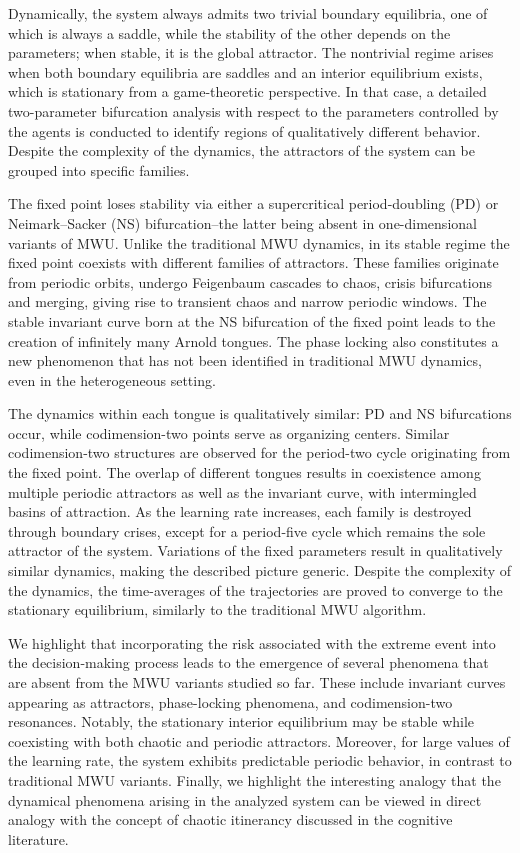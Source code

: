 \documentclass{article}
\theoremstyle{plain}
\theoremstyle{definition}
\begin{document}
Dynamically, the system always admits two trivial boundary equilibria, one of which is always a saddle, while the stability of the other depends on the parameters; when stable, it is the global attractor. The nontrivial regime arises when both boundary equilibria are saddles and an interior equilibrium exists, which is stationary from a game-theoretic perspective. In that case, a detailed two-parameter bifurcation analysis with respect to the parameters controlled by the agents is conducted to identify regions of qualitatively different behavior. Despite the complexity of the dynamics, the attractors of the system can be grouped into specific families. 

The fixed point loses stability via either a supercritical period-doubling (PD) or Neimark--Sacker (NS) bifurcation--the latter being absent in one-dimensional variants of MWU. Unlike the traditional MWU dynamics, in its stable regime the fixed point coexists with different families of attractors. These families originate from periodic orbits, undergo Feigenbaum cascades to chaos, crisis bifurcations and merging, giving rise to transient chaos and narrow periodic windows. The stable invariant curve born at the NS bifurcation of the fixed point leads to the creation of infinitely many Arnold tongues. The phase locking also constitutes a new phenomenon that has not been identified in traditional MWU dynamics, even in the heterogeneous setting.

The dynamics within each tongue is qualitatively similar: PD and NS bifurcations occur, while codimension-two points serve as organizing centers. Similar codimension-two structures are observed for the period-two cycle originating from the fixed point. The overlap of different tongues results in coexistence among multiple periodic attractors as well as the invariant curve, with intermingled basins of attraction. As the learning rate increases, each family is destroyed through boundary crises, except for a period-five cycle which remains the sole attractor of the system. Variations of the fixed parameters result in qualitatively similar dynamics, making the described picture generic. Despite the complexity of the dynamics, the time-averages of the trajectories are proved to converge to the stationary equilibrium, similarly to the traditional MWU algorithm.

We highlight that incorporating the risk associated with the extreme event into the decision-making process leads to the emergence of several phenomena that are absent from the MWU variants studied so far. These include invariant curves appearing as attractors, phase-locking phenomena, and codimension-two resonances. Notably, the stationary interior equilibrium may be stable while coexisting with both chaotic and periodic attractors. Moreover, for large values of the learning rate, the system exhibits predictable periodic behavior, in contrast to traditional MWU variants. Finally, we highlight the interesting analogy that the dynamical phenomena arising in the analyzed system can be viewed in direct analogy with the concept of chaotic itinerancy discussed in the cognitive literature.
\end{document}
